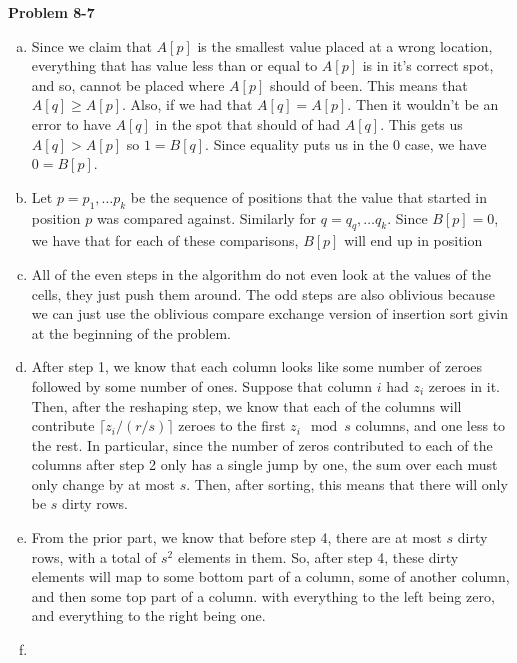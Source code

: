 \documentclass{article}
\begin{document}
\noindent\textbf{Problem 8-7}
\begin{enumerate}[a.]
\item
Since we claim that $A[p]$ is the smallest value placed at a wrong location, everything that has value less than or equal to $A[p]$ is in it's correct spot, and so, cannot be placed where $A[p]$ should of been. This means that $A[q] \ge A[p]$. Also, if we had that $A[q]=A[p]$. Then it wouldn't be an error to have $A[q]$ in the spot that should of had $A[q]$. This gets us $A[q] > A[p]$ so $1=B[q]$. Since equality puts us in the 0 case, we have $0=B[p]$.

\item

Let $p=p_1, \ldots p_k $ be the sequence of positions that the value that started in position $p$ was compared against. Similarly for $q = q_q, \ldots q_k$. Since $B[p]=0$, we have that for each of these comparisons, $B[p]$ will end up in position

\item

All of the even steps in the algorithm do not even look at the values of the cells, they just push them around. The odd steps are also oblivious because we can just use the oblivious compare exchange version of insertion sort givin at the beginning of the problem.

\item

After step 1, we know that each column looks like some number of zeroes followed by some number of ones. Suppose that column $i$ had $z_i$ zeroes in it. Then, after the reshaping step, we know that each of the columns will contribute $\lceil z_i / (r/s) \rceil$ zeroes to the first $z_i \mod s$ columns, and one less to the rest. In particular, since the number of zeros contributed to each of the columns after step 2 only has a single jump by one, the sum over each must only change by at most $s$. Then, after sorting, this means that there will only be $s$ dirty rows. 

\item

From the prior part, we know that before step 4, there are at most $s$ dirty rows, with a total of $s^2$ elements in them. So, after step 4, these dirty elements will map to some bottom part of a column, some of another column, and then some top part of a column. with everything to the left being zero, and everything to the right being one.

\item


\end{enumerate}
\end{document}
